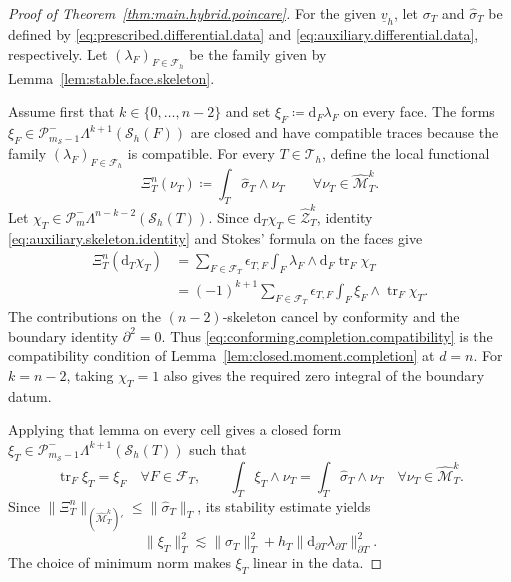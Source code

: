 \documentclass[a4paper,11pt]{article}
\theoremstyle{definition}
\newcommand{\DIFF}{\mathrm{d}}
\newcommand{\Sh}{\mathcal{S}_h}
\newcommand{\PLtrim}[2]{\mathcal{P}_{#1}^{-}\Lambda^{#2}}
\newcommand{\trc}{\operatorname{tr}}
\newcommand{\epsTF}{\epsilon_{T,F}}
\begin{document}
\begin{proof}[Proof of Theorem~\ref{thm:main.hybrid.poincare}]
For the given $\underline v_h$, let $\sigma_T$ and $\widehat\sigma_T$ be defined by \eqref{eq:prescribed.differential.data} and \eqref{eq:auxiliary.differential.data}, respectively.
Let $(\lambda_F)_{F\in\mathcal F_h}$ be the family given by Lemma~\ref{lem:stable.face.skeleton}.

Assume first that $k\in\{0,\ldots,n-2\}$ and set $\xi_F\coloneqq\DIFF_F\lambda_F$ on every face.
The forms $\xi_F\in\PLtrim{m_{\mathcal S}-1}{k+1}(\Sh(F))$ are closed and have compatible traces because the family $(\lambda_F)_{F\in\mathcal F_h}$ is compatible.
For every $T\in\mathcal T_h$, define the local functional
\[
  \Xi_T^n(\nu_T)
  \coloneqq
  \int_T\widehat\sigma_T\wedge\nu_T
  \qquad
  \forall\nu_T\in\widehat{\mathcal M}_T^k.
\]
Let $\chi_T\in\PLtrim{m}{n-k-2}(\Sh(T))$.
Since $\DIFF_T\chi_T\in\widehat{\mathcal Z}_T^k$, identity \eqref{eq:auxiliary.skeleton.identity} and Stokes' formula on the faces give
\begin{equation}\label{eq:conforming.completion.compatibility}
\begin{aligned}
  \Xi_T^n(\DIFF_T\chi_T)
  &=
  \sum_{F\in\mathcal F_T}
  \epsTF
  \int_F\lambda_F\wedge\DIFF_F\trc_F\chi_T
  \\
  &=
  (-1)^{k+1}
  \sum_{F\in\mathcal F_T}
  \epsTF
  \int_F\xi_F\wedge\trc_F\chi_T.
\end{aligned}
\end{equation}
The contributions on the $(n-2)$-skeleton cancel by conformity and the boundary identity $\partial^2=0$.
Thus \eqref{eq:conforming.completion.compatibility} is the compatibility condition of Lemma~\ref{lem:closed.moment.completion} at $d=n$.
For $k=n-2$, taking $\chi_T=1$ also gives the required zero integral of the boundary datum.

Applying that lemma on every cell gives a closed form $\xi_T\in\PLtrim{m_{\mathcal S}-1}{k+1}(\Sh(T))$ such that
\begin{equation}\label{eq:conforming.completion.differential}
  \trc_F\xi_T=\xi_F
  \quad\forall F\in\mathcal F_T,
  \qquad
  \int_T\xi_T\wedge\nu_T
  =
  \int_T\widehat\sigma_T\wedge\nu_T
  \quad\forall\nu_T\in\widehat{\mathcal M}_T^k.
\end{equation}
Since $\|\Xi_T^n\|_{(\widehat{\mathcal M}_T^k)'}\leq\|\widehat\sigma_T\|_T$, its stability estimate yields
\begin{equation}\label{eq:conforming.completion.differential.bound}
  \|\xi_T\|_T^2
  \lesssim
  \|\widehat\sigma_T\|_T^2
  +
  h_T\|\DIFF_{\partial T}\lambda_{\partial T}\|_{\partial T}^2.
\end{equation}
The choice of minimum norm makes $\xi_T$ linear in the data.


\end{proof}
\end{document}
